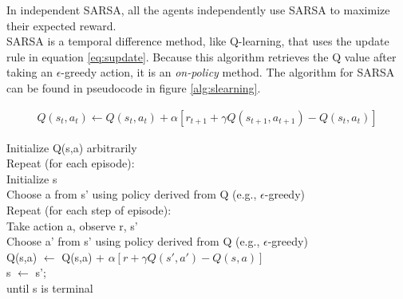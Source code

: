 In independent SARSA, all the agents independently use SARSA to maximize their expected reward.  \\ 

\noindent SARSA is a temporal difference method, like Q-learning, that uses the update rule in equation \ref{eq:supdate}. Because this algorithm retrieves the Q value after taking an $\epsilon$-greedy action, it is an \textit{on-policy} method. The algorithm for SARSA can be found in pseudocode in figure \ref{alg:slearning}.

\begin{mdframed}
\begin{align}
Q(s_t, a_t) \leftarrow Q(s_t,a_t) + \alpha \left[ r_{t+1} + \gamma Q(s_{t+1},a_{t+1}) - Q(s_t,a_t)\right]\label{eq:supdate}
\end{align}
\end{mdframed}


\begin{center}
\begin{mdframed}
\begin{algorithm}[H]
Initialize Q(s,a) arbitrarily\\
Repeat (for each episode):\\
\tab Initialize s \\
\tab Choose a from s' using policy derived from Q (e.g., $\epsilon$-greedy)\\
\tab Repeat (for each step of episode):\\
\dtab Take action a, observe r, s'\\
\dtab Choose a' from s' using policy derived from Q (e.g., $\epsilon$-greedy)\\
\dtab Q(s,a) $\leftarrow$ Q(s,a) + $\alpha [ r + \gamma Q(s', a') - Q(s, a) ]$ \\
\dtab s $\leftarrow$ s'; \\
\tab until s is terminal\\
\end{algorithm}
\end{mdframed}
\label{alg:slearning}
\end{center}
